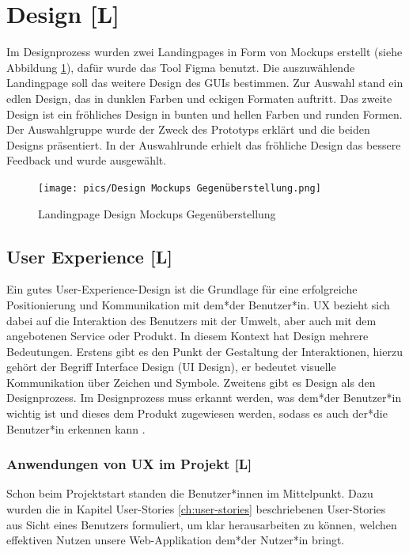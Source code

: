 \section{Design [L]}
Im Designprozess wurden zwei Landingpages in Form von Mockups erstellt (siehe Abbildung \ref{fig:impl:design:mokupsvs}), dafür wurde das Tool Figma benutzt. Die auszuwählende Landingpage soll das weitere Design des GUIs bestimmen.
Zur Auswahl stand ein edlen Design, das in dunklen Farben und eckigen Formaten auftritt.
Das zweite Design ist ein fröhliches Design in bunten und hellen Farben und runden Formen.
Der Auswahlgruppe wurde der Zweck des Prototyps erklärt und die beiden Designs präsentiert.
In der Auswahlrunde erhielt das fröhliche Design das bessere Feedback und wurde ausgewählt.

\begin{figure}[h t]
    \centering
    \texttt{[image: pics/Design Mockups Gegenüberstellung.png]}
    \caption{Landingpage Design Mockups Gegenüberstellung}
    \label{fig:impl:design:mokupsvs}
\end{figure}


\subsection{User Experience [L]}
Ein gutes User-Experience-Design ist die Grundlage für eine erfolgreiche Positionierung und Kommunikation mit dem*der Benutzer*in.
UX bezieht sich dabei auf die Interaktion des Benutzers mit der Umwelt, aber auch mit dem angebotenen Service oder Produkt. In diesem Kontext hat Design mehrere Bedeutungen.
Erstens gibt es den Punkt der Gestaltung der Interaktionen, hierzu gehört der Begriff Interface Design (UI Design), er bedeutet visuelle Kommunikation über Zeichen und Symbole.
Zweitens gibt es Design als den Designprozess. Im Designprozess muss erkannt werden, was dem*der Benutzer*in wichtig ist und dieses dem Produkt zugewiesen werden, sodass es auch der*die Benutzer*in erkennen kann \cite{UserExperienceDesign}.

\subsubsection{Anwendungen von UX im Projekt [L]}
Schon beim Projektstart standen die Benutzer*innen im Mittelpunkt. Dazu wurden die in Kapitel User-Stories \ref{ch:user-stories} beschriebenen User-Stories aus Sicht eines Benutzers formuliert, um klar herausarbeiten zu können, welchen effektiven Nutzen unsere Web-Applikation dem*der Nutzer*in bringt.

